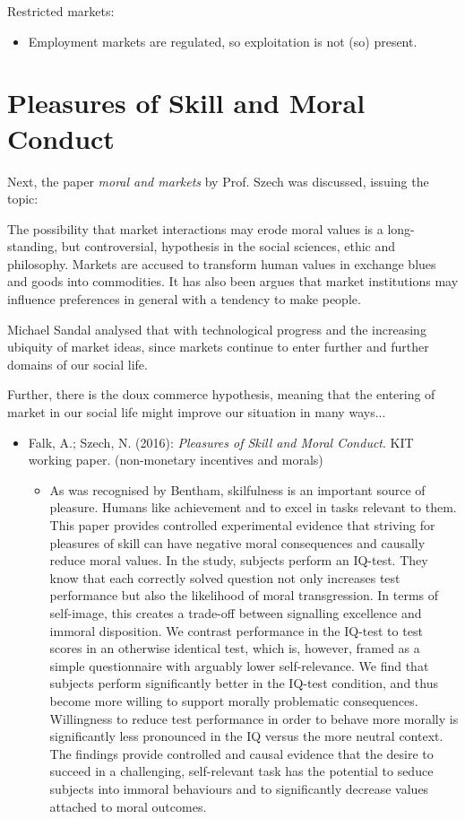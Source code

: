 Restricted markets:

\begin{itemize}
	\item Employment markets are regulated, so exploitation is not (so) present.
\end{itemize}

\section{Pleasures of Skill and Moral Conduct}


Next, the paper \textit{moral and markets} by Prof. Szech was discussed, issuing the topic:


The possibility that market interactions may erode moral values is a long-standing, but controversial, hypothesis in the social sciences, ethic and philosophy. Markets are accused to transform human values in exchange blues and goods into commodities. It has also been argues that market institutions may influence preferences in general with a tendency to make people.

Michael Sandal analysed that with technological progress and the increasing ubiquity of market ideas, since markets continue to enter further and further domains of our social life.


Further, there is the doux commerce hypothesis, meaning that the entering of market in our social life might improve our situation in many ways...

\begin{itemize}
	\item Falk, A.; Szech, N. (2016): \textit{Pleasures of Skill and Moral Conduct}. KIT working paper. (non-monetary incentives and morals)
		\begin{itemize}
			\item As was recognised by Bentham, skilfulness is an important source of pleasure. Humans like achievement and to excel in tasks relevant to them. This paper provides controlled experimental evidence that striving for pleasures of skill can have negative moral consequences and causally reduce moral values. In the study, subjects perform an IQ-test. They know that each correctly solved question not only increases test performance but also the likelihood of moral transgression. In terms of self-image, this creates a trade-off between signalling excellence and immoral disposition. We contrast performance in the IQ-test to test scores in an otherwise identical test, which is, however, framed as a simple questionnaire with arguably lower self-relevance. We find that subjects perform significantly better in the IQ-test condition, and thus become more willing to support morally problematic consequences. Willingness to reduce test performance in order to behave more morally is significantly less pronounced in the IQ versus the more neutral context. The findings provide controlled and causal evidence that the desire to succeed in a challenging, self-relevant task has the potential to seduce subjects into immoral behaviours and to significantly decrease values attached to moral outcomes.
		\end{itemize}
\end{itemize}


